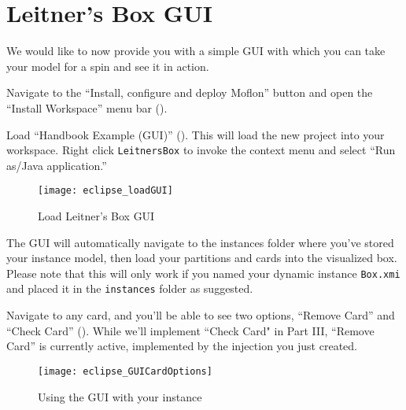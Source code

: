 \newpage
\section{Leitner's Box GUI}
\genHeader

We would like to now provide you with a simple GUI with which you can take your model for a spin and see it in action.

\begin{stepbystep}

\item Navigate to the ``Install, configure and deploy Moflon'' button and open the ``Install Workspace'' menu bar ().

\item Load ``Handbook Example (GUI)'' (). This will load the new project into your workspace. Right click \texttt{LeitnersBox} to invoke the context menu and select ``Run as/Java application.''

\begin{figure}[htbp]
    \centering
    \texttt{[image: eclipse\_loadGUI]}
    \caption{Load Leitner's Box GUI}
    \label{eclipse:GUI_load}
\end{figure}


\item The GUI will automatically navigate to the instances folder where you've stored your instance model, then load your partitions and
cards into the visualized box. Please note that this will only work if you named your dynamic instance \texttt{Box.xmi} and placed it in the \texttt{instances}
folder as suggested.

\vspace{0.5cm}

\item Navigate to any card, and you'll be able to see two options, ``Remove Card'' and ``Check Card''
(). While we'll implement ``Check Card" in Part III, ``Remove Card'' is currently active, implemented by the injection you
just created.

\vspace{1cm}

\begin{figure}[htbp]
    \centering
    \texttt{[image: eclipse\_GUICardOptions]}
    \caption{Using the GUI with your instance}
    \label{eclipse:GUI_cardOptions}
\end{figure}

\vspace{1cm}


\end{stepbystep}
